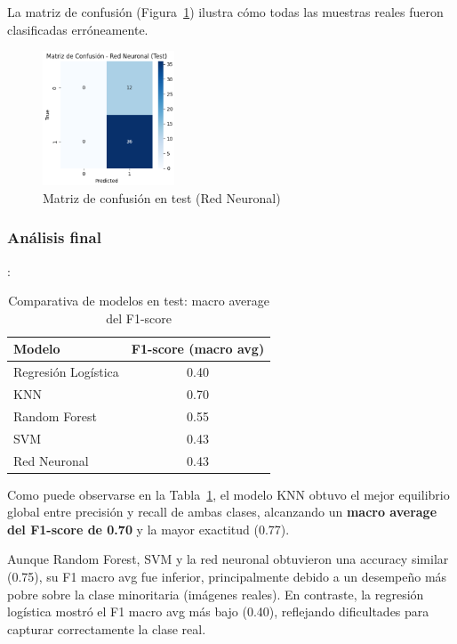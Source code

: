 \documentclass[conference]{IEEEtran}
\begin{document}
\vspace{0.2cm}
La matriz de confusión (Figura~\ref{fig:cm_nn}) ilustra cómo todas las muestras reales fueron clasificadas erróneamente.
\begin{figure}[htbp]
\centering
\includegraphics[width=0.35\textwidth]{images/cm_nn.png}
\caption{Matriz de confusión en test (Red Neuronal)}
\label{fig:cm_nn}
\end{figure}



\subsubsection{Análisis final}:


\begin{table}[htbp]
\centering
\caption{Comparativa de modelos en test: macro average del F1-score}
\begin{tabular}{lc}
\toprule
\textbf{Modelo} & \textbf{F1-score (macro avg)} \\
\midrule
Regresión Logística & 0.40 \\
KNN                 & 0.70 \\
Random Forest       & 0.55 \\
SVM                 & 0.43 \\
Red Neuronal        & 0.43 \\
\bottomrule
\end{tabular}
\label{tab:comparativa_f1_macro}
\end{table}


Como puede observarse en la Tabla~\ref{tab:comparativa_f1_macro}, el modelo KNN obtuvo el mejor equilibrio global entre precisión y recall de ambas clases, alcanzando un \textbf{macro average del F1-score de 0.70} y la mayor exactitud (0.77). 

Aunque Random Forest, SVM y la red neuronal obtuvieron una accuracy similar (0.75), su F1 macro avg fue inferior, principalmente debido a un desempeño más pobre sobre la clase minoritaria (imágenes reales). En contraste, la regresión logística mostró el F1 macro avg más bajo (0.40), reflejando dificultades para capturar correctamente la clase real.
\end{document}
